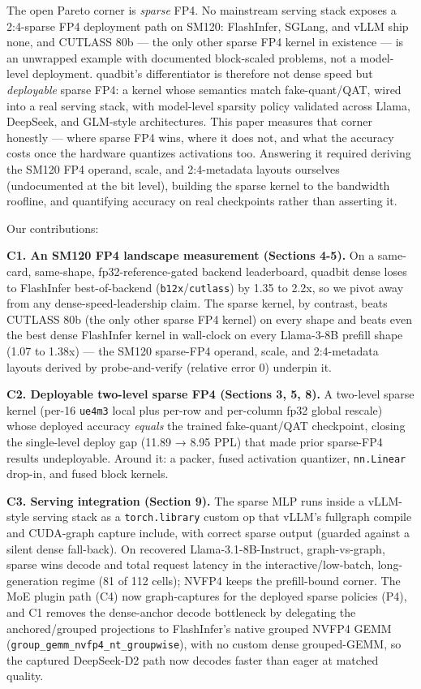 \documentclass[
]{article}
\begin{document}
The open Pareto corner is \emph{sparse} FP4. No mainstream serving stack
exposes a 2:4-sparse FP4 deployment path on SM120: FlashInfer, SGLang,
and vLLM ship none, and CUTLASS 80b --- the only other sparse FP4 kernel
in existence --- is an unwrapped example with documented block-scaled
problems, not a model-level deployment. quadbit's differentiator is
therefore not dense speed but \emph{deployable} sparse FP4: a kernel
whose semantics match fake-quant/QAT, wired into a real serving stack,
with model-level sparsity policy validated across Llama, DeepSeek, and
GLM-style architectures. This paper measures that corner honestly ---
where sparse FP4 wins, where it does not, and what the accuracy costs
once the hardware quantizes activations too. Answering it required
deriving the SM120 FP4 operand, scale, and 2:4-metadata layouts
ourselves (undocumented at the bit level), building the sparse kernel to
the bandwidth roofline, and quantifying accuracy on real checkpoints
rather than asserting it.

Our contributions:

\textbf{C1. An SM120 FP4 landscape measurement (Sections 4-5).} On a
same-card, same-shape, fp32-reference-gated backend leaderboard, quadbit
dense loses to FlashInfer best-of-backend
(\texttt{b12x}/\texttt{cutlass}) by 1.35 to 2.2x, so we pivot away from
any dense-speed-leadership claim. The sparse kernel, by contrast, beats
CUTLASS 80b (the only other sparse FP4 kernel) on every shape and beats
even the best dense FlashInfer kernel in wall-clock on every Llama-3-8B
prefill shape (1.07 to 1.38x) --- the SM120 sparse-FP4 operand, scale,
and 2:4-metadata layouts derived by probe-and-verify (relative error 0)
underpin it.

\textbf{C2. Deployable two-level sparse FP4 (Sections 3, 5, 8).} A
two-level sparse kernel (per-16 \texttt{ue4m3} local plus per-row and
per-column fp32 global rescale) whose deployed accuracy \emph{equals}
the trained fake-quant/QAT checkpoint, closing the single-level deploy
gap (11.89 → 8.95 PPL) that made prior sparse-FP4 results undeployable.
Around it: a packer, fused activation quantizer, \texttt{nn.Linear}
drop-in, and fused block kernels.

\textbf{C3. Serving integration (Section 9).} The sparse MLP runs inside
a vLLM-style serving stack as a \texttt{torch.library} custom op that
vLLM's fullgraph compile and CUDA-graph capture include, with correct
sparse output (guarded against a silent dense fall-back). On recovered
Llama-3.1-8B-Instruct, graph-vs-graph, sparse wins decode and total
request latency in the interactive/low-batch, long-generation regime (81
of 112 cells); NVFP4 keeps the prefill-bound corner. The MoE plugin path
(C4) now graph-captures for the deployed sparse policies (P4), and C1
removes the dense-anchor decode bottleneck by delegating the
anchored/grouped projections to FlashInfer's native grouped NVFP4 GEMM
(\texttt{group\_gemm\_nvfp4\_nt\_groupwise}), with no custom dense
grouped-GEMM, so the captured DeepSeek-D2 path now decodes faster than
eager at matched quality.
\end{document}
